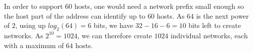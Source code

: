 In order to support $60$ hosts, one would need a network prefix small enough so the host part of the address can identify up to $60$ hosts. As $64$ is the next power of $2$, using up $log_2(64) = 6$ bits, we have $32 - 16 - 6 = 10$ bits left to create networks. As $2^{10}=1024$, we can therefore create $1024$ individual networks, each with a maximum of $64$ hosts.
